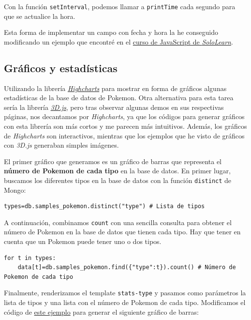 \documentclass{article}
\begin{document}
Con la función \texttt{setInterval}, podemos llamar a
\texttt{printTime} cada segundo para que se actualice la hora.

Esta forma de implementar un campo con fecha y hora la he conseguido
modificando un ejemplo que encontré en el
\href{https://www.sololearn.com/learning/1024}{curso de JavaScript de
  \textit{SoloLearn}}.

\subsection{Gráficos y estadísticas}

Utilizando la librería
\href{https://www.highcharts.com/}{\textit{Highcharts}} para mostrar
en forma de gráficos algunas estadísticas de la base de datos de
Pokemon. Otra alternativa para esta tarea sería la librería
\href{https://d3js.org/}{\textit{3D.js}}, pero tras observar algunas
demos en sus respectivas páginas, nos decantamos por
\textit{Highcharts}, ya que los códigos para generar gráficos con esta
librería son más cortos y me parecen más intuitivos. Además, los
gráficos de \textit{Highcharts} son interactivos, mientras que los
ejemplos que he visto de gráficos con \textit{3D.js} generaban simples
imágenes.

  El primer gráfico que generamos es un gráfico de barras que
  representa el \textbf{número de Pokemon de cada tipo} en la base de
  datos. En primer lugar, buscamos los diferentes tipos en la base de
  datos con la función \texttt{distinct} de Mongo:
\begin{verbatim}
types=db.samples_pokemon.distinct("type") # Lista de tipos
\end{verbatim}
  A continuación, combinamos \texttt{count} con una sencilla consulta
  para obtener el número de Pokemon en la base de datos que tienen
  cada tipo. Hay que tener en cuenta que un Pokemon puede tener uno o dos tipos.
\begin{verbatim}
for t in types:
    data[t]=db.samples_pokemon.find({"type":t}).count() # Número de Pokemon de cada tipo
\end{verbatim}
  Finalmente, renderizamos el template \texttt{stats-type} y pasamos
  como parámetros la lista de tipos y una lista con el número de
  Pokemon de cada tipo. Modificamos el código de
  \href{https://www.highcharts.com/docs/getting-started/your-first-chart}{este
    ejemplo} para generar el siguiente gráfico de barras:
\end{document}
